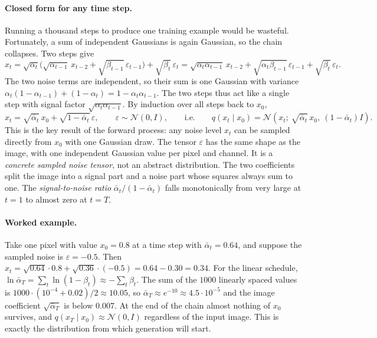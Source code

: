 \paragraph{Closed form for any time step.}
Running a thousand steps to produce one training example would be wasteful.
Fortunately, a sum of independent Gaussians is again Gaussian, so the chain
collapses. Two steps give
\begin{equation*}
  x_t = \sqrt{\alpha_t}\bigl(\sqrt{\alpha_{t-1}}\,x_{t-2}
      + \sqrt{\beta_{t-1}}\,\varepsilon_{t-1}\bigr) + \sqrt{\beta_t}\,\varepsilon_t
      = \sqrt{\alpha_t\alpha_{t-1}}\,x_{t-2}
      + \sqrt{\alpha_t\beta_{t-1}}\,\varepsilon_{t-1}
      + \sqrt{\beta_t}\,\varepsilon_t .
\end{equation*}
\noindent
The two noise terms are independent, so their sum is one Gaussian with
variance $\alpha_t(1-\alpha_{t-1})+(1-\alpha_t)=1-\alpha_t\alpha_{t-1}$. The
two steps thus act like a single step with signal factor
$\sqrt{\alpha_t\alpha_{t-1}}$. By induction over all steps back to $x_0$,
\begin{equation}
  x_t = \sqrt{\bar\alpha_t}\,x_0 + \sqrt{1-\bar\alpha_t}\,\varepsilon,
  \qquad \varepsilon\sim\mathcal N(0,I),
  \qquad\text{i.e.}\qquad
  q(x_t\mid x_0)=\mathcal N\!\left(x_t;\ \sqrt{\bar\alpha_t}\,x_0,\
  (1-\bar\alpha_t)I\right).
  \label{eq:diff-marginal}
\end{equation}
\noindent
This is the key result of the forward process: any noise level $x_t$ can be
sampled directly from $x_0$ with one Gaussian draw. The tensor $\varepsilon$
has the same shape as the image, with one independent Gaussian value per pixel
and channel. It is a \emph{concrete sampled noise tensor}, not an abstract
distribution. The two coefficients split the image into a signal part and a
noise part whose squares always sum to one. The \emph{signal-to-noise ratio}
$\bar\alpha_t/(1-\bar\alpha_t)$ falls monotonically from very large at $t=1$
to almost zero at $t=T$.

\paragraph{Worked example.}
Take one pixel with value $x_0=0.8$ at a time step with $\bar\alpha_t=0.64$,
and suppose the sampled noise is $\varepsilon=-0.5$. Then
$x_t=\sqrt{0.64}\cdot0.8+\sqrt{0.36}\cdot(-0.5)=0.64-0.30=0.34$. For the
linear schedule, $\ln\bar\alpha_T=\sum_t\ln(1-\beta_t)\approx-\sum_t\beta_t$.
The sum of the $1000$ linearly spaced values is
$1000\cdot(10^{-4}+0.02)/2\approx10.05$, so $\bar\alpha_T\approx e^{-10}
\approx4.5\cdot10^{-5}$ and the image coefficient $\sqrt{\bar\alpha_T}$ is
below $0.007$. At the end of the chain almost nothing of $x_0$ survives, and
$q(x_T\mid x_0)\approx\mathcal N(0,I)$ regardless of the input image. This is
exactly the distribution from which generation will start.

